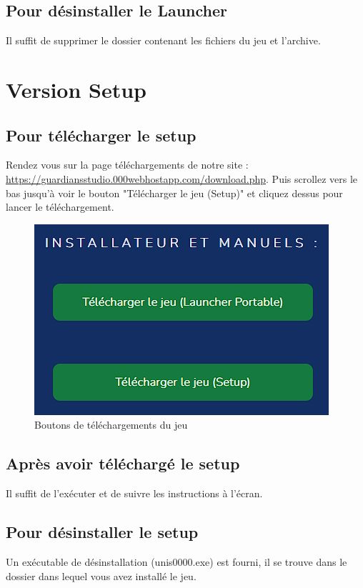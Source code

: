 \documentclass[a4paper, 12pt]{article}
\begin{document}
	\subsection{Pour désinstaller le Launcher}
	Il suffit de supprimer le dossier contenant les fichiers du jeu et l'archive.
	
	\section{Version Setup}
	\subsection{Pour télécharger le setup}
	Rendez vous sur la page téléchargements de notre site :
	\url{https://guardiansstudio.000webhostapp.com/download.php}.
	Puis scrollez vers le bas jusqu'à voir le bouton "Télécharger le jeu (Setup)" et cliquez dessus pour lancer le téléchargement.
	
	\begin{figure}[ht]
		\centering
		\includegraphics[scale=0.6]{images/download_launcher.png}
		\caption{Boutons de téléchargements du jeu}
	\end{figure}
	
	\subsection{Après avoir téléchargé le setup}
	Il suffit de l'exécuter et de suivre les instructions à l'écran.
	\subsection{Pour désinstaller le setup}
	Un exécutable de désinstallation (unis0000.exe) est fourni, il se trouve dans le dossier dans lequel vous avez installé le jeu. 
	
\end{document}
